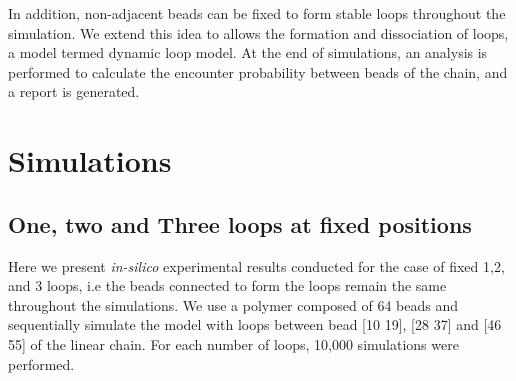 \documentclass[12pt]{paper}
\begin{document}
 In addition, non-adjacent beads can be fixed to form stable loops throughout the simulation. We extend this idea to allows the formation and dissociation of loops, a model termed dynamic loop model.
At the end of simulations, an analysis is performed to calculate the encounter probability between beads of the chain, and a report is generated.  

\section{Simulations}

\subsection{One, two and Three loops at fixed positions}
Here we present \textit{in-silico} experimental results conducted for the case of fixed 1,2, and 3 loops, i.e the beads connected to form the loops remain the same throughout the simulations. We use a polymer composed of 64 beads and sequentially simulate the model with loops between bead [10 19], [28 37] and  [46 55] of the linear chain.
For each number of loops, 10,000 simulations were performed.
\end{document}
